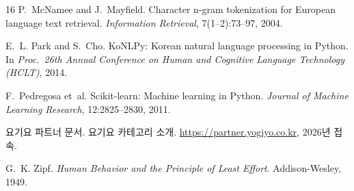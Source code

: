 \documentclass[10pt,twocolumn]{article}
\begin{document}
\begin{thebibliography}{16}
P.~McNamee and J.~Mayfield.
\newblock Character n-gram tokenization for European language text
retrieval.
\newblock \emph{Information Retrieval}, 7(1--2):73--97, 2004.

E.~L. Park and S.~Cho.
\newblock KoNLPy: Korean natural language processing in Python.
\newblock In \emph{Proc.\ 26th Annual Conference on Human and Cognitive
Language Technology (HCLT)}, 2014.

F.~Pedregosa et~al.
\newblock Scikit-learn: Machine learning in Python.
\newblock \emph{Journal of Machine Learning Research}, 12:2825--2830, 2011.

요기요 파트너 문서.
\newblock 요기요 카테고리 소개.
\newblock \url{https://partner.yogiyo.co.kr}, 2026년 접속.

G.~K. Zipf.
\newblock \emph{Human Behavior and the Principle of Least Effort}.
\newblock Addison-Wesley, 1949.

\end{thebibliography}
\end{document}
